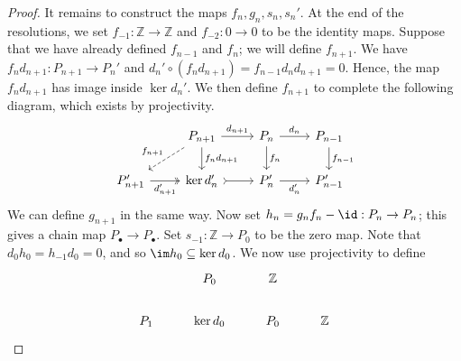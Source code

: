 \begin{proof}
    It remains to construct the maps \( f_n, g_n, s_n, s_n' \).
    At the end of the resolutions, we set \( f_{-1} : \mathbb Z \to \mathbb Z \) and \( f_{-2} : 0 \to 0 \) to be the identity maps.
    Suppose that we have already defined \( f_{n-1} \) and \( f_n \); we will define \( f_{n+1} \).
    We have \( f_n d_{n+1} : P_{n+1} \to P_n' \) and \( d_n' \circ (f_n d_{n+1}) = f_{n-1} d_n d_{n+1} = 0 \).
    Hence, the map \( f_n d_{n+1} \) has image inside \( \ker d_n' \).
    We then define \( f_{n+1} \) to complete the following diagram, which exists by projectivity.
\[\begin{tikzcd}
	& {P_{n+1}} & {P_n} & {P_{n-1}} \\
	{P_{n+1}'} & {\ker d_n'} & {P_n'} & {P_{n-1}'}
	\arrow["{d_{n+1}}", from=1-2, to=1-3]
	\arrow["{d_n}", from=1-3, to=1-4]
	\arrow["{d_n'}"', from=2-3, to=2-4]
	\arrow["{f_n}", from=1-3, to=2-3]
	\arrow["{f_{n-1}}", from=1-4, to=2-4]
	\arrow[tail, from=2-2, to=2-3]
	\arrow["{d_{n+1}'}"', two heads, from=2-1, to=2-2]
	\arrow["{f_n d_{n+1}}", from=1-2, to=2-2]
	\arrow["{f_{n+1}}"', dashed, from=1-2, to=2-1]
\end{tikzcd}\]
    We can define \( g_{n+1} \) in the same way.
    Now set \( h_n = g_n f_n - \id : P_n \to P_n \); this gives a chain map \( P_\bullet \to P_\bullet \).
    Set \( s_{-1} : \mathbb Z \to P_0 \) to be the zero map.
    Note that \( d_0 h_0 = h_{-1} d_0 = 0 \), and so \( \im h_0 \subseteq \ker d_0 \).
    We now use projectivity to define
\[\begin{tikzcd}
	& {P_0} & {\mathbb Z} \\
	{P_1} & {\ker d_0} & {P_0} & {\mathbb Z}

\end{tikzcd}\]
\end{proof}
